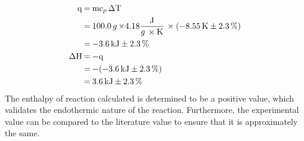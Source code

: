 \documentclass{article}
\begin{document}
\begin{equation}
    \begin{split}
        \ce{
        q &= mc_p \Delta T \\ 
        &= 100.0 g \times} 4.18 \ce{\frac{J}{g \times K} \times (-8.55 K \pm 2.3 \%) \\
        &= -3.6 kJ \pm 2.3\% \\
        \Delta H &= -q \\ 
        &= -(-3.6 kJ \pm 2.3\%) \\ 
        &= 3.6 kJ \pm 2.3\%
        }
    \end{split}
\end{equation}
The enthalpy of reaction calculated is determined to be a positive value, which validates the endothermic nature of the reaction. Furthermore, the experimental value can be compared to the literature value to ensure that it is approximately the same. \\ \\
\end{document}

